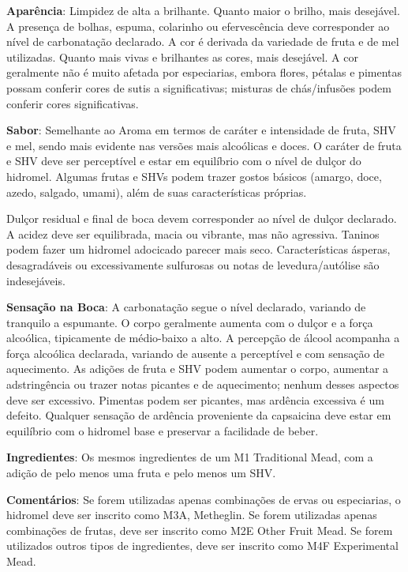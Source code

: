 \textbf{Aparência}: Limpidez de alta a brilhante. Quanto maior o brilho, mais desejável. A presença de bolhas, espuma, colarinho ou efervescência deve corresponder ao nível de carbonatação declarado. A cor é derivada da variedade de fruta e de mel utilizadas. Quanto mais vivas e brilhantes as cores, mais desejável. A cor geralmente não é muito afetada por especiarias, embora flores, pétalas e pimentas possam conferir cores de sutis a significativas; misturas de chás/infusões podem conferir cores significativas.

\textbf{Sabor}: Semelhante ao Aroma em termos de caráter e intensidade de fruta, SHV e mel, sendo mais evidente nas versões mais alcoólicas e doces. O caráter de fruta e SHV deve ser perceptível e estar em equilíbrio com o nível de dulçor do hidromel. Algumas frutas e SHVs podem trazer gostos básicos (amargo, doce, azedo, salgado, umami), além de suas características próprias.

Dulçor residual e final de boca devem corresponder ao nível de dulçor declarado. A acidez deve ser equilibrada, macia ou vibrante, mas não agressiva. Taninos podem fazer um hidromel adocicado parecer mais seco. Características ásperas, desagradáveis ou excessivamente sulfurosas ou notas de levedura/autólise são indesejáveis.

\textbf{Sensação na Boca}: A carbonatação segue o nível declarado, variando de tranquilo a espumante. O corpo geralmente aumenta com o dulçor e a força alcoólica, tipicamente de médio-baixo a alto. A percepção de álcool acompanha a força alcoólica declarada, variando de ausente a perceptível e com sensação de aquecimento. As adições de fruta e SHV podem aumentar o corpo, aumentar a adstringência ou trazer notas picantes e de aquecimento; nenhum desses aspectos deve ser excessivo. Pimentas podem ser picantes, mas ardência excessiva é um defeito. Qualquer sensação de ardência proveniente da capsaicina deve estar em equilíbrio com o hidromel base e preservar a facilidade de beber.

\textbf{Ingredientes}: Os mesmos ingredientes de um M1 Traditional Mead, com a adição de pelo menos uma fruta e pelo menos um SHV.

\textbf{Comentários}: Se forem utilizadas apenas combinações de ervas ou especiarias, o hidromel deve ser inscrito como M3A, Metheglin. Se forem utilizadas apenas combinações de frutas, deve ser inscrito como M2E Other Fruit Mead. Se forem utilizados outros tipos de ingredientes, deve ser inscrito como M4F Experimental Mead.

